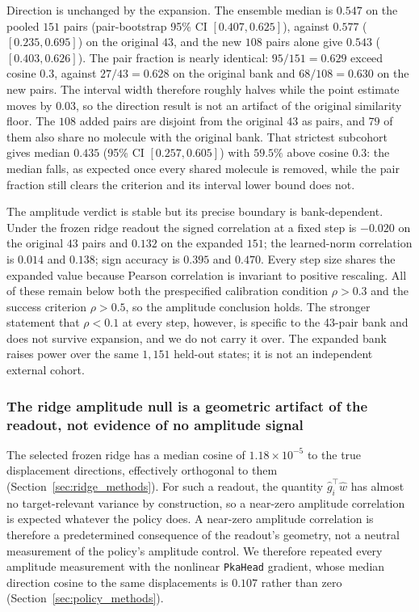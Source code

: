 \documentclass[11pt]{article}
\begin{document}
Direction is unchanged by the expansion. The ensemble median is $0.547$ on the pooled $151$ pairs (pair-bootstrap 95\% CI $[0.407,0.625]$), against $0.577$ ($[0.235,0.695]$) on the original $43$, and the new $108$ pairs alone give $0.543$ ($[0.403,0.626]$). The pair fraction is nearly identical: $95/151=0.629$ exceed cosine $0.3$, against $27/43=0.628$ on the original bank and $68/108=0.630$ on the new pairs. The interval width therefore roughly halves while the point estimate moves by $0.03$, so the direction result is not an artifact of the original similarity floor. The $108$ added pairs are disjoint from the original $43$ as pairs, and $79$ of them also share no molecule with the original bank. That strictest subcohort gives median $0.435$ (95\% CI $[0.257,0.605]$) with $59.5\%$ above cosine $0.3$: the median falls, as expected once every shared molecule is removed, while the pair fraction still clears the criterion and its interval lower bound does not.

The amplitude verdict is stable but its precise boundary is bank-dependent. Under the frozen ridge readout the signed correlation at a fixed step is $-0.020$ on the original $43$ pairs and $0.132$ on the expanded $151$; the learned-norm correlation is $0.014$ and $0.138$; sign accuracy is $0.395$ and $0.470$. Every step size shares the expanded value because Pearson correlation is invariant to positive rescaling. All of these remain below both the prespecified calibration condition $\rho>0.3$ and the success criterion $\rho>0.5$, so the amplitude conclusion holds. The stronger statement that $\rho<0.1$ at every step, however, is specific to the 43-pair bank and does not survive expansion, and we do not carry it over. The expanded bank raises power over the same $1{,}151$ held-out states; it is not an independent external cohort.

\subsubsection{The ridge amplitude null is a geometric artifact of the readout, not evidence of no amplitude signal} The selected frozen ridge has a median cosine of $1.18\times10^{-5}$ to the true displacement directions, effectively orthogonal to them (Section~\ref{sec:ridge_methods}). For such a readout, the quantity $\hat g_i^\top\hat w$ has almost no target-relevant variance by construction, so a near-zero amplitude correlation is expected whatever the policy does. A near-zero amplitude correlation is therefore a predetermined consequence of the readout's geometry, not a neutral measurement of the policy's amplitude control. We therefore repeated every amplitude measurement with the nonlinear \texttt{PkaHead} gradient, whose median direction cosine to the same displacements is $0.107$ rather than zero (Section~\ref{sec:policy_methods}).
\end{document}
